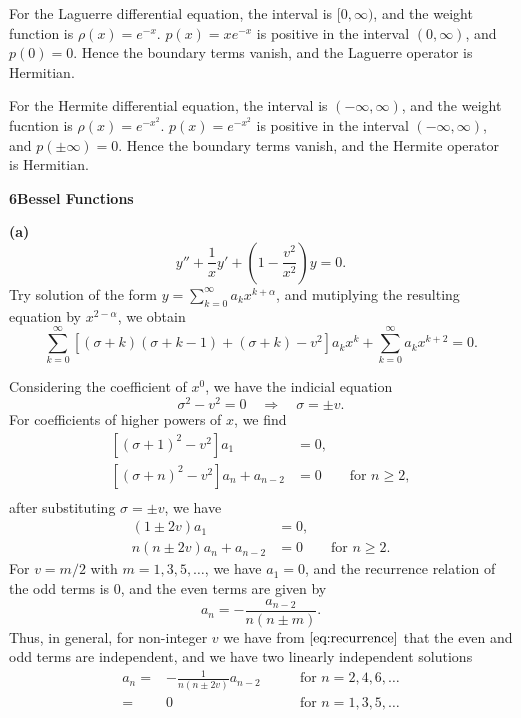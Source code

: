 \documentclass[12pt]{article}
\newcommand{\problem}[2]{%
    \par\vspace{1em}
    \noindent\textbf{#1\quad #2}
    \par\smallskip
}
\begin{document}
For the Laguerre differential equation, the interval is $[0,\infty)$, and the weight function is $\rho(x) = e^{-x}$. $p(x) = xe^{-x}$ is positive in the interval $(0,\infty)$, and $p(0) = 0$. Hence the boundary terms vanish, and the Laguerre operator is Hermitian.
\smallbreak

For the Hermite differential equation, the interval is $(-\infty,\infty)$, and the weight fucntion is $\rho(x) = e^{-x^2}$. $p(x) = e^{-x^2}$ is positive in the interval $(-\infty,\infty)$, and $p(\pm \infty) = 0$. Hence the boundary terms vanish, and the Hermite operator is Hermitian.

\pagebreak
\problem{6}{Bessel Functions}
\noindent\textbf{(a)} 
\begin{equation}
    y'' + \frac{1}{x}y' + \left(1 - \frac{v^2}{x^2}\right)y = 0.
\end{equation}
Try solution of the form $y = \sum_{k=0}^{\infty} a_k x^{k+\alpha}$, and mutiplying the resulting equation by $x^{2-\alpha}$, we obtain
\begin{equation}
    \sum_{k=0}^{\infty}[(\sigma + k)(\sigma + k -1) + (\sigma + k) -v^2]a_k x^k + \sum_{k=0}^{\infty} a_k x^{k+2} = 0.
\end{equation}

Considering the coefficient of $x^0$, we have the indicial equation
\begin{equation}
    \sigma^2 - v^2 = 0 \quad \Longrightarrow \quad \sigma = \pm v.
\end{equation} 
For coefficients of higher powers of $x$, we find
\begin{equation}
\begin{aligned}
    [(\sigma + 1)^2 - v^2]a_1 &= 0,\\
    [(\sigma + n)^2 - v^2]a_n + a_{n-2} &= 0  \qquad \text{for }n \ge 2,\\
\end{aligned}
\end{equation}
after substituting $\sigma = \pm v$, we have
\begin{equation}
\begin{aligned}
    (1 \pm 2v)a_1 &= 0,\\
    n(n \pm 2v)a_n + a_{n-2} &= 0  \qquad \text{for }n \ge 2.
    \label{eq:recurrence}
\end{aligned}
\end{equation}
For $v = m/2$ with $m = 1,3,5,\ldots$, we have $a_1 = 0$, and the recurrence relation of the odd terms is $0$, and the even terms are given by
\begin{equation}
    a_{n} = -\frac{a_{n-2}}{n(n \pm m)}.
\end{equation}
Thus, in general, for non-integer $v$ we have from $\eqref{eq:recurrence}$ that the even and odd terms are independent, and we have two linearly independent solutions
\begin{equation}
\begin{aligned}
    a_n =& -\frac{1}{n (n \pm 2v)}a_{n-2} \qquad &\text{for }n = 2, 4, 6,\ldots\\
    =&0 & \text{for }n = 1, 3, 5,\ldots 
\end{aligned}
\end{equation}
\end{document}
